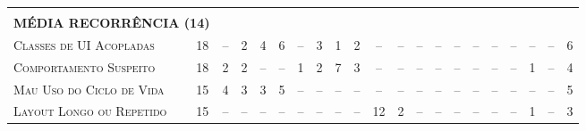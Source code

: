 \begin{table*}
\begin{tabular}{@{}p{4.2cm}p{0.3cm}p{.2cm}p{.2cm}p{.2cm}p{.2cm}p{.2cm}p{.2cm}p{.2cm}p{.2cm}p{.2cm}p{.4cm}p{.4cm}p{.4cm}p{.4cm}p{.4cm}p{.4cm}p{.4cm}p{.4cm}p{.4cm}p{0.2cm}@{}}
\vspace{1sp} \\
\multicolumn{2}{l}{\scriptsize{\textbf{MÉDIA RECORRÊNCIA (14)}}} \\ 
\textsc{Classes de UI Acopladas}           	& \multicolumn{1}{c}{18} 	& \multicolumn{1}{c}{--} 	& \multicolumn{1}{c}{2} 	& \multicolumn{1}{c}{4}	 	& \multicolumn{1}{c}{6} 	& \multicolumn{1}{c}{--} 	& \multicolumn{1}{c}{3} 	& \multicolumn{1}{c}{1} 	& \multicolumn{1}{c}{2} 	& \multicolumn{1}{c}{--} 	& \multicolumn{1}{c}{--} 	& \multicolumn{1}{c}{--} 	& \multicolumn{1}{c}{--} 	& \multicolumn{1}{c}{--} 	& \multicolumn{1}{c}{--} 	& \multicolumn{1}{c}{--}	& \multicolumn{1}{c}{--} 	& \multicolumn{1}{c}{--} 	& \multicolumn{1}{c}{--} 	& \multicolumn{1}{c}{6} \\
\textsc{Comportamento Suspeito}            	& \multicolumn{1}{c}{18} 	& \multicolumn{1}{c}{2} 	& \multicolumn{1}{c}{2} 	& \multicolumn{1}{c}{--} 	& \multicolumn{1}{c}{--} 	& \multicolumn{1}{c}{1} 	& \multicolumn{1}{c}{2} 	& \multicolumn{1}{c}{7} 	& \multicolumn{1}{c}{3} 	& \multicolumn{1}{c}{--} 	& \multicolumn{1}{c}{--} 	& \multicolumn{1}{c}{--} 	& \multicolumn{1}{c}{--} 	& \multicolumn{1}{c}{--} 	& \multicolumn{1}{c}{--} 	& \multicolumn{1}{c}{--}	& \multicolumn{1}{c}{--} 	& \multicolumn{1}{c}{1} 	& \multicolumn{1}{c}{--} 	& \multicolumn{1}{c}{4} \\
\textsc{Mau Uso do Ciclo de Vida}          	& \multicolumn{1}{c}{15} 	& \multicolumn{1}{c}{4} 	& \multicolumn{1}{c}{3} 	& \multicolumn{1}{c}{3}	 	& \multicolumn{1}{c}{5} 	& \multicolumn{1}{c}{--} 	& \multicolumn{1}{c}{--} 	& \multicolumn{1}{c}{--} 	& \multicolumn{1}{c}{--} 	& \multicolumn{1}{c}{--} 	& \multicolumn{1}{c}{--} 	& \multicolumn{1}{c}{--} 	& \multicolumn{1}{c}{--} 	& \multicolumn{1}{c}{--} 	& \multicolumn{1}{c}{--} 	& \multicolumn{1}{c}{--}	& \multicolumn{1}{c}{--} 	& \multicolumn{1}{c}{--} 	& \multicolumn{1}{c}{--} 	& \multicolumn{1}{c}{5} \\
\textsc{Layout Longo ou Repetido}          	& \multicolumn{1}{c}{15} 	& \multicolumn{1}{c}{--} 	& \multicolumn{1}{c}{--} 	& \multicolumn{1}{c}{--} 	& \multicolumn{1}{c}{--} 	& \multicolumn{1}{c}{--} 	& \multicolumn{1}{c}{--} 	& \multicolumn{1}{c}{--} 	& \multicolumn{1}{c}{--} 	& \multicolumn{1}{c}{12} 	& \multicolumn{1}{c}{2} 	& \multicolumn{1}{c}{--} 	& \multicolumn{1}{c}{--} 	& \multicolumn{1}{c}{--} 	& \multicolumn{1}{c}{--} 	& \multicolumn{1}{c}{--}	& \multicolumn{1}{c}{--} 	& \multicolumn{1}{c}{1} 	& \multicolumn{1}{c}{--} 	& \multicolumn{1}{c}{3} \\

\end{tabular}
\end{table*}
